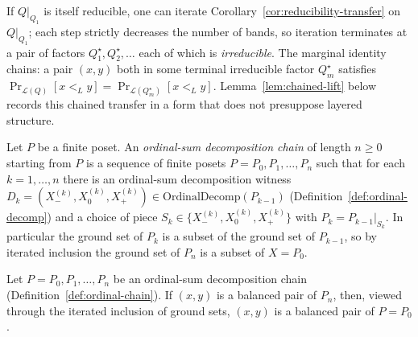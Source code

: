 \begin{remark}
\label{rem:iterated-reduction}
If $Q|_{Q_1}$ is itself reducible, one can iterate
Corollary~\ref{cor:reducibility-transfer} on $Q|_{Q_1}$; each step
strictly decreases the number of bands, so iteration terminates at a
pair of factors $Q^\star_1, Q^\star_2, \ldots$ each of which is
\emph{irreducible}. The marginal identity chains: a pair $(x,y)$ both
in some terminal irreducible factor $Q^\star_m$ satisfies
$\Pr_{\mathcal L(Q)}[x <_L y] = \Pr_{\mathcal L(Q^\star_m)}[x <_L y]$.
Lemma~\ref{lem:chained-lift} below records this chained transfer in a
form that does not presuppose layered structure.
\end{remark}

\begin{definition}
\label{def:ordinal-chain}
Let $P$ be a finite poset. An \emph{ordinal-sum decomposition chain}
of length $n \ge 0$ starting from $P$ is a sequence of finite posets
$P = P_0, P_1, \ldots, P_n$ such that for each $k = 1, \ldots, n$
there is an ordinal-sum decomposition witness
$D_k = (X^{(k)}_-, X^{(k)}_0, X^{(k)}_+) \in
\mathrm{OrdinalDecomp}(P_{k-1})$
(Definition~\ref{def:ordinal-decomp}) and a choice of piece
$S_k \in \{X^{(k)}_-, X^{(k)}_0, X^{(k)}_+\}$ with
$P_k = P_{k-1}|_{S_k}$. In particular the ground set of $P_k$ is a
subset of the ground set of $P_{k-1}$, so by iterated inclusion the
ground set of $P_n$ is a subset of $X = P_0$.
\end{definition}

\begin{lemma}
\label{lem:chained-lift}
Let $P = P_0, P_1, \ldots, P_n$ be an ordinal-sum decomposition chain
(Definition~\ref{def:ordinal-chain}). If $(x, y)$ is a balanced pair
of $P_n$, then, viewed through the iterated inclusion of ground sets,
$(x, y)$ is a balanced pair of $P = P_0$.
\end{lemma}

